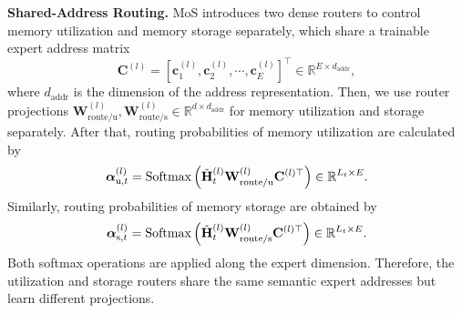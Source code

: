 \textbf{Shared-Address Routing.}
MoS introduces two dense routers to control memory utilization and memory storage separately, which share a trainable expert address matrix
\begin{equation*}
    \mathbf{C}^{(l)}
    =
    \left[
    \mathbf{c}_{1}^{(l)},
    \mathbf{c}_{2}^{(l)},
    \cdots,
    \mathbf{c}_{E}^{(l)}
    \right]^\top
    \in
    \mathbb{R}^{E \times d_{\mathrm{addr}}},
\end{equation*}
where $d_{\mathrm{addr}}$ is the dimension of the address representation.
Then, we use router projections $\mathbf{W}_{\text{route/u}}^{(l)},\mathbf{W}_{\text{route/s}}^{(l)}
\in\mathbb{R}^{d\times d_{\mathrm{addr}}}$ for memory utilization and storage separately.
After that, routing probabilities of memory utilization are calculated by
\begin{equation*}
    \bm{\alpha}_{\text{u},t}^{(l)}
    =
    \operatorname{Softmax}
    \left(
    \tilde{\mathbf{H}}_{t}^{(l)}
    \mathbf{W}_{\text{route/u}}^{(l)}
    \mathbf{C}^{(l)\top}
    \right)
    \in\mathbb{R}^{L_t\times E}.
\end{equation*}
Similarly, routing probabilities of memory storage are obtained by
\begin{equation*}
    \bm{\alpha}_{\text{s},t}^{(l)}
    =
    \operatorname{Softmax}
    \left(
    \tilde{\mathbf{H}}_{t}^{(l)}
    \mathbf{W}_{\text{route/s}}^{(l)}
    \mathbf{C}^{(l)\top}
    \right)
    \in\mathbb{R}^{L_t\times E}.
\end{equation*}
Both softmax operations are applied along the expert dimension.
Therefore, the utilization and storage routers share the same semantic expert addresses but learn different projections.

